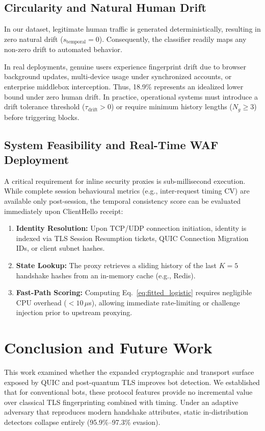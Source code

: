 \documentclass[conference]{IEEEtran}
\begin{document}
\subsection{Circularity and Natural Human Drift}
In our dataset, legitimate human traffic is generated deterministically, resulting in zero natural drift ($s_{\text{temporal}} = 0$). Consequently, the classifier readily maps any non-zero drift to automated behavior. 

In real deployments, genuine users experience fingerprint drift due to browser background updates, multi-device usage under synchronized accounts, or enterprise middlebox interception. Thus, 18.9\% represents an idealized lower bound under zero human drift. In practice, operational systems must introduce a drift tolerance threshold ($\tau_{\text{drift}} > 0$) or require minimum history lengths ($N_g \ge 3$) before triggering blocks.

\subsection{System Feasibility and Real-Time WAF Deployment}
A critical requirement for inline security proxies is sub-millisecond execution. While complete session behavioural metrics (e.g., inter-request timing CV) are available only post-session, the temporal consistency score can be evaluated immediately upon ClientHello receipt:
\begin{enumerate}
    \item \textbf{Identity Resolution:} Upon TCP/UDP connection initiation, identity is indexed via TLS Session Resumption tickets, QUIC Connection Migration IDs, or client subnet hashes.
    \item \textbf{State Lookup:} The proxy retrieves a sliding history of the last $K=5$ handshake hashes from an in-memory cache (e.g., Redis).
    \item \textbf{Fast-Path Scoring:} Computing Eq.~\ref{eq:fitted_logistic} requires negligible CPU overhead ($<10\,\mu$s), allowing immediate rate-limiting or challenge injection prior to upstream proxying.
\end{enumerate}

\section{Conclusion and Future Work}
This work examined whether the expanded cryptographic and transport surface exposed by QUIC and post-quantum TLS improves bot detection. We established that for conventional bots, these protocol features provide no incremental value over classical TLS fingerprinting combined with timing. Under an adaptive adversary that reproduces modern handshake attributes, static in-distribution detectors collapse entirely (95.9\%--97.3\% evasion).
\end{document}
